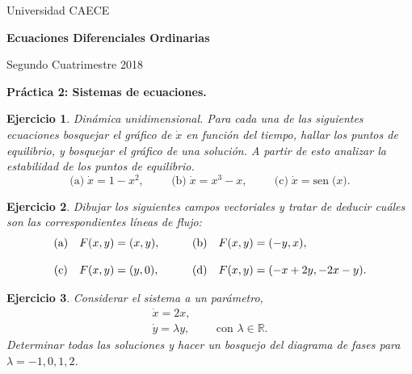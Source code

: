 \documentclass[11pt,a4paper,pdftex]{amsart}
\newtheorem{ej}{Ejercicio}%
\numberwithin{equation}{section}%
\newcommand{\bej}[1]{\begin{ej}\rm{#1}}
\newcommand{\eej}{\end{ej}\vspace{-0.2cm}}
\renewcommand{\bf}{\textbf}
\newcommand{\0}{\mathbb O}
\newcommand{\8}{\infty}
\newcommand{\sen}[1]{\mbox{sen}\;{#1}}
\begin{document}

\centerline{{\small Universidad CAECE}}

 \vskip 0.2cm
 \hrulefill
 \vskip 0.2cm

 \centerline{{\bf{\Large{\sc Ecuaciones Diferenciales Ordinarias}}}}
 \vskip 0.2cm
 \centerline{\ttfamily Segundo Cuatrimestre 2018}
 \hrulefill

 \medskip
 \centerline{\bf {Práctica 2: Sistemas de ecuaciones.}}
 \medskip

\setcounter{equation}{0}

\bej
{\emph {Din\'amica unidimensional}.} Para cada una de las siguientes 
ecuaciones bosquejar el gráfico de $\dot x$ en funci\'on del tiempo, hallar 
los puntos de equilibrio, y bosquejar el gr\'afico de una solución. A partir 
de esto analizar la estabilidad de los puntos de equilibrio.
$$
\text{(a)}\; \dot{x}=1-x^2, \hspace{1cm} \text{(b)}\; \dot{x}=x^3-x, \hspace{1cm} \text{(c)}\; \dot{x}=\sen(x).
$$
\eej

\bej Dibujar los siguientes campos vectoriales y tratar de deducir cuáles son 
las correspondientes líneas de flujo:
\[%
\begin{array}
[c]{clcccl}%
\text{(a)} & F(x,y)=(x,y), &  &  & \text{(b)} & F(x,y)=(-y,x),\\
&  &  &  &  & \\
\text{(c)} & F(x,y)=(y,0), &  &  & \text{(d)} & F(x,y)=(-x+2y,-2x-y).
\end{array}
\]%
\eej


\bej Considerar el sistema a un par\'ametro,
$$\begin{aligned}
\dot{x}=2x, &\\
\dot{y}=\lambda y, &\ \ \ \ \ \mbox{ con } \lambda \in \mathbb{R}.
\end{aligned}$$
Determinar todas las soluciones y hacer un bosquejo del diagrama
de fases para $\lambda=-1,0,1,2$.
\eej
\end{document}
